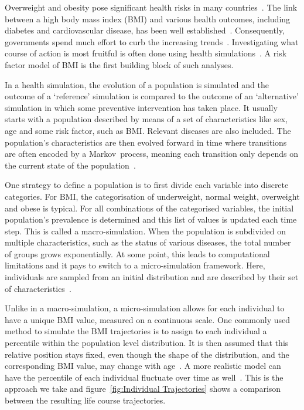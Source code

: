 \documentclass{imammb}
\numberwithin{equation}{section}
\begin{document}
Overweight and obesity pose significant health risks in many countries~\citep{Dai2020}. The link between a high body mass index (BMI) and various health outcomes, including diabetes and cardiovascular disease, has been well established~\citep{Murray2020}. Consequently, governments spend much effort to curb the increasing trends~\citep{VWS2018, VanRinsum2018}. Investigating what course of action is most fruitful is often done using health simulations~\citep{Levy2011}. A risk factor model of BMI is the first building block of such analyses.

In a health simulation, the evolution of a population is simulated and the outcome of a `reference' simulation is compared to the outcome of an `alternative' simulation in which some preventive intervention has taken place. It usually starts with a population described by means of a set of characteristics like sex, age and some risk factor, such as BMI. Relevant diseases are also included. The population's characteristics are then evolved forward in time where transitions are often encoded by a \mbox{Markov process}, meaning each transition only depends on the current state of the population~\citep{Sonnenberg1993}.

One strategy to define a population is to first divide each variable into discrete categories. For BMI, the categorisation of underweight, normal weight, overweight and obese is typical. For all combinations of the categorised variables, the initial population's prevalence is determined and this list of values is updated each time step. This is called a macro-simulation. When the population is subdivided on multiple characteristics, such as the status of various diseases, the total number of groups grows exponentially. At some point, this leads to computational limitations and it pays to switch to a micro-simulation framework. Here, individuals are sampled from an initial distribution and are described by their set of characteristics~\citep{Levy2011}.

Unlike in a macro-simulation, a micro-simulation allows for each individual to have a unique BMI value, measured on a continuous scale. One commonly used method to simulate the BMI trajectories is to assign to each individual a percentile within the population level distribution. It is then assumed that this relative position stays fixed, even though the shape of the distribution, and the corresponding BMI value, may change with age~\citep{McPherson2007, OECD2019}. A more realistic model can have the percentile of each individual fluctuate over time as well~\citep{Vuik2021}. This is the approach we take and figure~\ref{fig:Individual Trajectories} shows a comparison between the resulting life course trajectories.
\end{document}
